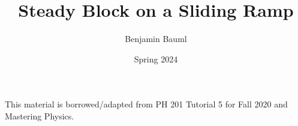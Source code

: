 \documentclass[]{article}
\title{Steady Block on a Sliding Ramp}
\author{Benjamin Bauml}
\date{Spring 2024}
\newcommand{\FileDepth}{../..}
\begin{document}
\maketitle
\begin{center}
	This material is borrowed/adapted from PH 201 Tutorial 5 for Fall 2020 and Mastering Physics.
\end{center}


\end{document}
